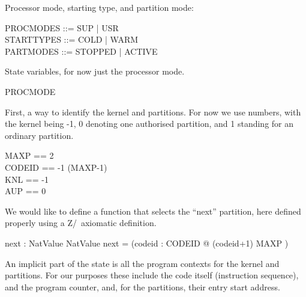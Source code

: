 Processor mode, starting type, and partition mode:
\begin{circus}
   PROCMODES ::= SUP | USR
\\ STARTTYPES ::= COLD | WARM
\\ PARTMODES ::= STOPPED | ACTIVE
\end{circus}

State variables, for now just the processor mode.
\begin{circus}
PROCMODE 
\end{circus}

First, a way to identify the kernel and partitions.
For now we use numbers, with the kernel being -1,
0 denoting one authorised partition,
and 1 standing for an ordinary partition.
\begin{circus}
   MAXP   == 2
\\ CODEID == -1 \upto (MAXP-1)
\\ KNL    == -1
\\ AUP    == 0
\end{circus}


We would like to define a function that selects the ``next'' partition,
here defined properly using a Z/\Circus\ axiomatic definition.
\begin{axdef}
  next : NatValue \fun NatValue
\where
  next = (\lambda codeid : CODEID @ (codeid+1) \mod MAXP
  )
\end{axdef}

An implicit part of the state is all the program
contexts for the kernel and partitions.
For our purposes these include the code itself (instruction sequence),
and the program counter, and, for the partitions,
their entry start address.

